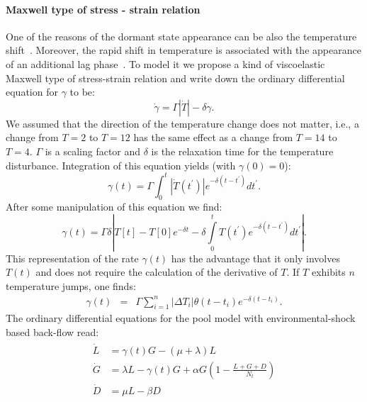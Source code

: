 \documentclass[10pt,A4paper]{article}
\numberwithin{equation}{section}
\begin{document}
\paragraph{Maxwell type of stress - strain relation}
One of the reasons of the dormant state appearance can be also the temperature shift~\cite{oliver_viable_1995}.
Moreover, the rapid shift in temperature is associated with the appearance of an additional lag phase~\cite{zwietering_modeling_1994}.
To model it we propose a kind of viscoelastic Maxwell type of stress-strain relation and write down the ordinary differential equation for $\gamma$ to be:
\begin{equation}
    \dot{\gamma} = \Gamma |\dot{T}|-\delta \gamma.
\end{equation}
We assumed that the direction of the temperature change does not matter, i.e., a change from $T=2$ to $T=12$ has the same effect as a change from $T=14$ to $T=4$.
$\Gamma$ is a scaling factor and $\delta$ is the relaxation time for the temperature disturbance.
Integration of this equation yields (with $\gamma(0)=0$):
\begin{equation}
    \gamma(t) = \Gamma \int_0^t |\dot{T}(t^{\prime})|e^{-\delta (t-t^{\prime})}dt^{\prime}.
\end{equation}
After some manipulation of this equation we find:
\begin{equation}
    \gamma(t) = \Gamma\delta\left |T[t]-T[0]e^{-\delta t}-\delta
        \int\limits_0^t T(t^{\prime})e^{-\delta (t-t^{\prime})}dt^{\prime}\right |.
\end{equation}
This representation of the rate $\gamma(t)$ has the advantage that it only involves $T(t)$ and does not require the calculation of the derivative of $T$.
If $T$ exhibits $n$ temperature jumps, one finds:
\begin{eqnarray}
    \gamma(t) &=& \Gamma\sum_{i=1}^n \left |\Delta T_i \right |\theta(t-t_i)e^{-\delta(t-t_i)}.
\label{eq:gamma_tempshift}
\end{eqnarray}
%
The ordinary differential equations for the pool model with environmental-shock based back-flow read:
\begin{align}
    \begin{split}
        \dot{L} &=\gamma(t) G - (\mu + \lambda) L\\
        \dot{G} &= \lambda L -\gamma(t) G + \alpha G\left(1-\frac{L+G+D}{N_t}\right)\\
        \dot{D} &= \mu  L - \beta D
    \end{split}
\label{eq:ode_tempshift_backlag}
\end{align}
\end{document}
